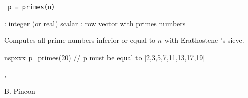 
\begin{mandesc}
\end{mandesc}

\begin{calling_sequence}
\begin{verbatim}
 p = primes(n)
\end{verbatim}
\end{calling_sequence}

\begin{parameters}
  \begin{varlist}
   : integer (or real) scalar
   : row vector with primes numbers
  \end{varlist}
\end{parameters}

\begin{mandescription}
  Computes all prime numbers inferior or equal to $n$ with 
  Erathostene 's sieve.
\end{mandescription}

\begin{examples}
\begin{mintednsp}{nspxxx}
p=primes(20)
// p must be equal to [2,3,5,7,11,13,17,19]
\end{mintednsp}
\end{examples}


\begin{manseealso}
, 
\end{manseealso}

\begin{authors}
B. Pincon
\end{authors}

